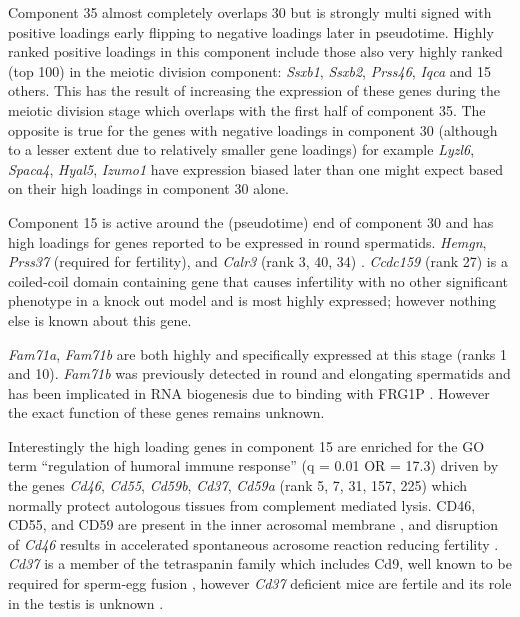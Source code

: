 Component 35 almost completely overlaps 30 but is strongly multi signed with positive loadings early flipping to negative loadings later in pseudotime. Highly ranked positive loadings in this component include those also very highly ranked (top 100) in the meiotic division component: \textit{Ssxb1}, \textit{Ssxb2}, \textit{Prss46}, \textit{Iqca} and 15 others. This has the result of increasing the expression of these genes during the meiotic division stage which overlaps with the first half of component 35. The opposite is true for the genes with negative loadings in component 30 (although to a lesser extent due to relatively smaller gene loadings) for example \textit{Lyzl6}, \textit{Spaca4}, \textit{Hyal5}, \textit{Izumo1} have expression biased later than one might expect based on their high loadings in component 30 alone.

Component 15 is active around the (pseudotime) end of component 30 and has high loadings for genes reported to be expressed in round spermatids. \textit{Hemgn}, \textit{Prss37} (required for fertility), and \textit{Calr3} (rank 3, 40, 34) \parencite{Shen2013Prss37}. \textit{Ccdc159} (rank 27) is a coiled-coil domain containing gene that causes infertility with no other significant phenotype in a knock out model and is most highly expressed; however nothing else is known about this gene.

\textit{Fam71a}, \textit{Fam71b} are both highly and specifically expressed at this stage (ranks 1 and 10). \textit{Fam71b} was previously detected in round and elongating spermatids \parencite{Petit2015Combining} and has been implicated in RNA biogenesis due to binding with FRG1P \parencite{vanKoningsbruggen2007FRG1Pmediated}. However the exact function of these genes remains unknown.

Interestingly the high loading genes in component 15 are enriched for the GO term ``regulation of humoral immune response'' (q = 0.01 OR = 17.3) driven by the genes \textit{Cd46}, \textit{Cd55}, \textit{Cd59b}, \textit{Cd37}, \textit{Cd59a} (rank 5, 7, 31, 157, 225) which normally protect autologous tissues from complement mediated lysis. CD46, CD55, and CD59 are present in the inner acrosomal membrane \parencite{Cummerson2006complement}, and disruption of \textit{Cd46} results in accelerated spontaneous acrosome reaction reducing fertility \parencite{Inoue2003Disruption}. \textit{Cd37} is a member of the tetraspanin family which includes Cd9, well known to be required for sperm-egg fusion \parencite{Kaji2000gamete, Naour2000Severely, Miyado2000Requirement}, however \textit{Cd37} deficient mice are fertile and its role in the testis is unknown \parencite{Knobeloch2000Targeted}.

